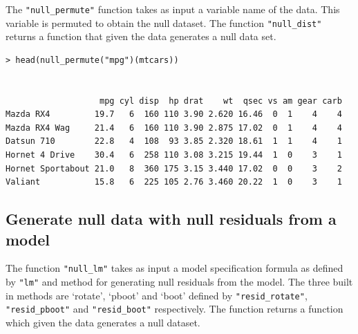 \documentclass[article]{jss}
\begin{document}
The \texttt{"null\_permute"} function takes as input a variable name of
the data. This variable is permuted to obtain the null dataset. The
function \texttt{"null\_dist"} returns a function that given the data
generates a null data set.

\begin{verbatim}
> head(null_permute("mpg")(mtcars))


                   mpg cyl disp  hp drat    wt  qsec vs am gear carb
Mazda RX4         19.7   6  160 110 3.90 2.620 16.46  0  1    4    4
Mazda RX4 Wag     21.4   6  160 110 3.90 2.875 17.02  0  1    4    4
Datsun 710        22.8   4  108  93 3.85 2.320 18.61  1  1    4    1
Hornet 4 Drive    30.4   6  258 110 3.08 3.215 19.44  1  0    3    1
Hornet Sportabout 21.0   8  360 175 3.15 3.440 17.02  0  0    3    2
Valiant           15.8   6  225 105 2.76 3.460 20.22  1  0    3    1
\end{verbatim}

%

\subsection{Generate null data with null residuals from a
model}\label{generate-null-data-with-null-residuals-from-a-model}

The function \texttt{"null\_lm"} takes as input a model specification
formula as defined by \texttt{"lm"} and method for generating null
residuals from the model. The three built in methods are `rotate',
`pboot' and `boot' defined by \texttt{"resid\_rotate"},
\texttt{"resid\_pboot"} and \texttt{"resid\_boot"} respectively. The
function returns a function which given the data generates a null
dataset.
\end{document}
